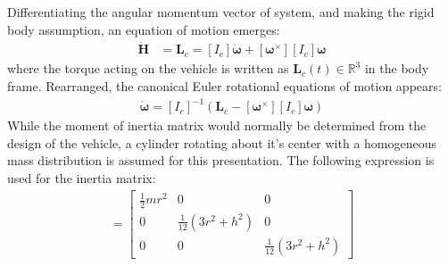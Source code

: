 \documentclass[conf]{new-aiaa}
\begin{document}
Differentiating the angular momentum vector of system, and making the rigid body assumption, an equation of motion emerges:
\begin{align}
\dot{\bm{H}} &= \mathbf{L}_c = [I_c]\dot{\boldsymbol{\omega}} + [\boldsymbol{\omega}^\times][I_c]\boldsymbol{\omega}
\end{align}
where the torque acting on the vehicle is written as $\mathbf{L}_c(t) \in \mathbb{R}^3$ in the body frame. Rearranged, the canonical Euler rotational equations of motion appears:
\begin{align}
	\dot{\boldsymbol{\omega}} = [I_c]^{-1}(\mathbf{L}_c - [\boldsymbol{\omega}^\times][I_c]\boldsymbol{\omega})
\end{align}
While the moment of inertia matrix would normally be determined from the design of the vehicle, a cylinder rotating about it's center with a homogeneous mass distribution is assumed for this presentation. The following expression is used for the inertia matrix:
\begin{align}
[I_c] = 
	\begin{bmatrix}
		\frac{1}{2} m r^{2} & 0 & 0 \\
		0 & \frac{1}{12}\left(3 r^{2}+h^{2}\right) & 0 \\
		0 & 0 & \frac{1}{12}\left(3 r^{2}+h^{2}\right)
	\end{bmatrix}
\end{align}
\end{document}
